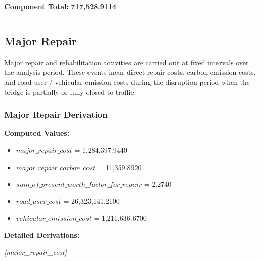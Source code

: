 \documentclass[12pt,a4paper]{article}
\begin{document}
\textbf{Component Total:} \textbf{\Large 717,528.9114}


\medskip\hrule\medskip


\subsection{Major Repair}

Major repair and rehabilitation activities are carried out at fixed intervals over the analysis period. These events incur direct repair costs, carbon emission costs, and road user / vehicular emission costs during the disruption period when the bridge is partially or fully closed to traffic.


\subsubsection{Major Repair Derivation}

\textbf{Computed Values:}

\begin{itemize}
  \item $major\_repair\_cost$ = 1,284,397.9440
  \item $major\_repair\_carbon\_cost$ = 11,359.8920
  \item $sum\_of\_present\_worth\_factor\_for\_repair$ = 2.2740
  \item $road\_user\_cost$ = 26,323,141.2100
  \item $vehicular\_emission\_cost$ = 1,211,636.6700
\end{itemize}

\textbf{Detailed Derivations:}


\textit{[major\_repair\_cost]}
\end{document}
